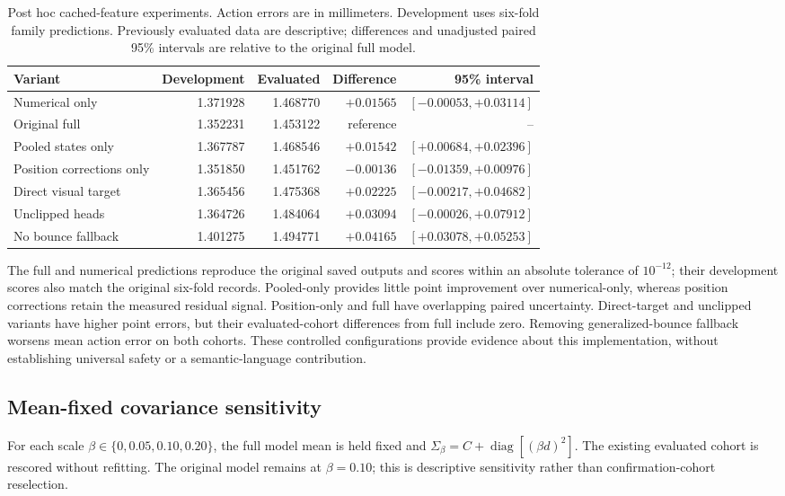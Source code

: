 \par\begin{table}[htbp]\centering\small
\caption{Post hoc cached-feature experiments. Action errors are in millimeters. Development uses six-fold family predictions. Previously evaluated data are descriptive; differences and unadjusted paired 95\% intervals are relative to the original full model.}
\label{tab:support_readout}
\begin{tabular}{lrrrr}\toprule Variant & Development & Evaluated & Difference & 95\% interval\\\midrule
Numerical only & 1.371928 & 1.468770 & $+0.01565$ & $[-0.00053,+0.03114]$ \\
Original full & 1.352231 & 1.453122 & reference & -- \\
Pooled states only & 1.367787 & 1.468546 & $+0.01542$ & $[+0.00684,+0.02396]$ \\
Position corrections only & 1.351850 & 1.451762 & $-0.00136$ & $[-0.01359,+0.00976]$ \\
Direct visual target & 1.365456 & 1.475368 & $+0.02225$ & $[-0.00217,+0.04682]$ \\
Unclipped heads & 1.364726 & 1.484064 & $+0.03094$ & $[-0.00026,+0.07912]$ \\
No bounce fallback & 1.401275 & 1.494771 & $+0.04165$ & $[+0.03078,+0.05253]$ \\
\bottomrule\end{tabular}\end{table}\par

The full and numerical predictions reproduce the original saved outputs and scores within an absolute tolerance of $10^{-12}$; their development scores also match the original six-fold records. Pooled-only provides little point improvement over numerical-only, whereas position corrections retain the measured residual signal. Position-only and full have overlapping paired uncertainty. Direct-target and unclipped variants have higher point errors, but their evaluated-cohort differences from full include zero. Removing generalized-bounce fallback worsens mean action error on both cohorts. These controlled configurations provide evidence about this implementation, without establishing universal safety or a semantic-language contribution.

\subsection{Mean-fixed covariance sensitivity}
For each scale $\beta\in\{0,0.05,0.10,0.20\}$, the full model mean is held fixed and $\Sigma_\beta=C+\operatorname{diag}[(\beta d)^2]$. The existing evaluated cohort is rescored without refitting. The original model remains at $\beta=0.10$; this is descriptive sensitivity rather than confirmation-cohort reselection.

